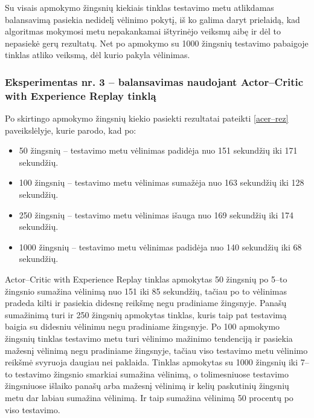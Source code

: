 \documentclass{VUMIFPSbakalaurinis}
\begin{document}
Su visais apmokymo žingsnių kiekiais tinklas testavimo metu atlikdamas balansavimą pasiekia nedidelį vėlinimo pokytį, iš ko galima daryt prielaidą, kad algoritmas mokymosi metu nepakankamai ištyrinėjo veiksmų aibę ir dėl to nepasiekė gerų rezultatų. Net po apmokymo su 1000 žingsnių testavimo pabaigoje tinklas atliko veiksmą, dėl kurio pakyla vėlinimas.

\subsubsection{Eksperimentas nr. 3 – balansavimas naudojant Actor–Critic with Experience Replay tinklą}
Po skirtingo apmokymo žingsnių kiekio pasiekti rezultatai pateikti \ref{acer–rez} paveikslėlyje, kurie parodo, kad po:
\begin{itemize}
    \item 50 žingsnių – testavimo metu vėlinimas padidėja nuo 151 sekundžių iki 171 sekundžių. 
    \item 100 žingsnių – testavimo metu vėlinimas sumažėja nuo 163 sekundžių iki 128 sekundžių.
    \item 250 žingsnių – testavimo metu vėlinimas išauga nuo 169 sekundžių iki 174 sekundžių.
    \item 1000 žingsnių – testavimo metu vėlinimas padidėja nuo 140 sekundžių iki 68 sekundžių.
\end{itemize}

Actor–Critic with Experience Replay tinklas apmokytas 50 žingsnių po 5–to žingsnio sumažina vėlinimą nuo 151 iki 85 sekundžių, tačiau po to vėlinimas pradeda kilti ir pasiekia didesnę reikšmę negu pradiniame žingsnyje. Panašų sumažinimą turi ir 250 žingsnių apmokytas tinklas, kuris taip pat testavimą baigia su didesniu vėlinimu negu pradiniame žingsnyje. Po 100 apmokymo žingsnių  tinklas testavimo metu turi vėlinimo mažinimo tendenciją ir pasiekia mažesnį vėlinimą negu pradiniame žingsnyje, tačiau viso testavimo metu vėlinimo reikšmė svyruoja daugiau nei paklaida. Tinklas apmokytas su 1000 žingsnių iki 7–to testavimo žingsnio smarkiai sumažina vėlinimą, o tolimesniuose testavimo žingsniuose išlaiko panašų arba mažesnį vėlinimą ir kelių paskutinių žingsnių metu dar labiau sumažina vėlinimą. Ir taip sumažina vėlinimą 50 procentų po viso testavimo.
\end{document}
